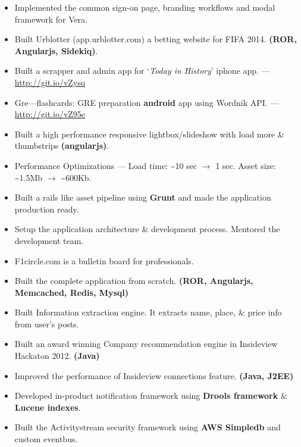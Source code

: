 \documentclass{resume}
\begin{document}
\begin{itemize} \itemsep1pt \parskip0pt
  \item Implemented the common sign-on page, branding workflows and modal framework for Vera.
  \item Built Urblotter (app.urblotter.com) a betting website for FIFA 2014. \textbf{(ROR, Angularjs, Sidekiq)}.
  \item Built a scrapper and admin app for `\textit{Today in History}' iphone app. --- \url{http://git.io/vZysq}
  \item Gre---flashcards: GRE preparation \textbf{android} app using Wordnik API\@. --- \url{http://git.io/vZ95e}
\end{itemize}
\begin{itemize} \itemsep1pt \parskip0pt
  \item Built a high performance responsive lightbox/slideshow with load more \& thumbstrips \textbf{(angularjs)}.
  \item Performance Optimizations --- Load time: \textasciitilde10 sec \( \rightarrow \) 1 sec.  
    Asset size: \textasciitilde1.5Mb \( \rightarrow \) \textasciitilde600Kb.
  \item Built a rails like asset pipeline using \textbf{Grunt} and made the application production ready.
  \item Setup the application architecture \& development process. Mentored the development team.
\end{itemize}
\begin{itemize} \itemsep1pt \parskip0pt
  \item F1circle.com is a bulletin board for professionals.
  \item Built the complete application from scratch. \textbf{(ROR, Angularjs, Memcached, Redis, Mysql)}
  \item Built Information extraction engine. It extracts name, place, \& price info from user's posts.
\end{itemize}
\begin{itemize} \itemsep1pt \parskip0pt
  \item Built an award winning Company recommendation engine in Insideview Hackaton 2012. \textbf{(Java)}
  \item Improved the performance of Insideview connections feature. \textbf{(Java, J2EE)}
  \item Developed in-product notification framework using \textbf{Drools framework} \& \textbf{Lucene indexes}.
  \item Built the Activitystream security framework using \textbf{AWS Simpledb} and custom eventbus.
\end{itemize}
\end{document}
